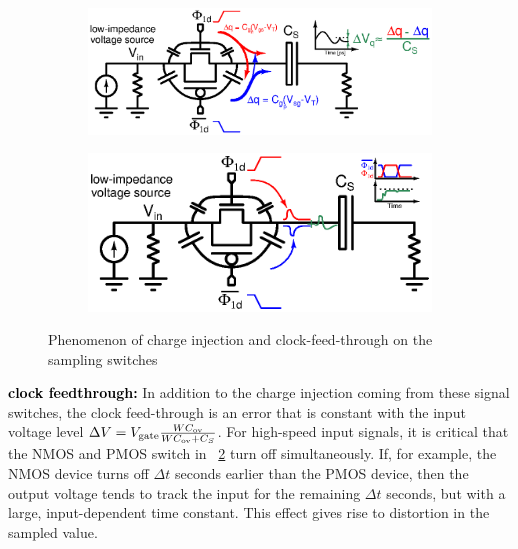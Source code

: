 \begin{figure}[htp]
	\centering
	\begin{subfigure}[b]{0.52\textwidth}
		\centering
		\includegraphics[width=\textwidth]{Chapter4/Figs/charge-injection.ps}
		\label{fig:charge-injection-switches}
	\end{subfigure}
	\begin{subfigure}[b]{0.46\textwidth}
		\centering
		\includegraphics[width=\textwidth]{Chapter4/Figs/clock-feedthrough.ps}
		\label{fig:clock-feedthrough-switches}
	\end{subfigure}
	\caption{Phenomenon of charge injection and clock-feed-through on the sampling switches}
	\label{fig:sample-switches-error-source}
\end{figure}

\textbf{\textcolor{black}{clock feedthrough:}}
In addition to the charge injection coming from these signal switches, the clock feed-through is an error that is constant with the input voltage level \(\Delta V = V_{\rm gate} \frac{W C_{\rm ov}}{W C_{\rm ov}+C_S}\). For high-speed input signals, it is critical that the NMOS and PMOS switch in \figurename~\ref{fig:clock-feedthrough-switches} turn off simultaneously. If, for example, the NMOS device turns off \(\Delta t\) seconds earlier than the PMOS device, then the output voltage tends to track the input for the remaining \(\Delta t\) seconds, but with a large, input-dependent time constant. This effect gives rise to distortion in the sampled value.

